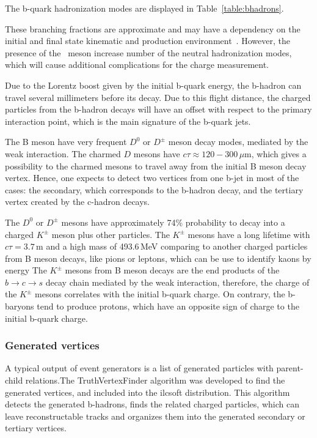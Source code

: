 The b-quark hadronization modes are displayed in Table~\ref{table:bhadrons}.


These branching fractions are approximate and may have a dependency on the initial and final state kinematic and production environment~\cite{bib:PDG}.
However, the presence of the \Bzs\ meson increase number of the neutral hadronization modes, which will cause additional complications for the charge measurement. 

Due to the Lorentz boost given by the initial b-quark energy, the b-hadron can travel several millimeters before its decay. Due to this flight distance, the charged particles from the b-hadron decays will have an offset with respect to the primary interaction point, which is the main signature of the b-quark jets. 

The B meson have very frequent $D^0$ or $D^\pm$ meson decay modes, mediated by the weak interaction. The charmed $D$ mesons have $c\tau \approx 120 - 300$\,$\mu$m, which gives a possibility to the charmed mesons to travel away from the initial B meson decay vertex. 
Hence, one expects to detect two vertices from one b-jet in most of the cases: the secondary, which corresponds to the b-hadron decay, and the tertiary vertex created by the c-hadron decays. 

The $D^0$ or $D^\pm$ mesons have approximately 74\% probability to decay into a charged $K^\pm$ meson plus other particles. The $K^\pm$ mesons have a long lifetime with $c\tau = 3.7$\,m and a high mass of 493.6\,MeV comparing to another charged particles from B meson decays, like pions or leptons, which can be use to identify kaons by energy The $K^\pm$ mesons from B meson decays are the end products of the $b\to c\to s$ decay chain mediated by the weak interaction, therefore, the charge of the $K^\pm$ mesons correlates with the initial b-quark charge. 
On contrary, the b-baryons tend to produce protons, which have an opposite sign of charge to the initial b-quark charge. 

\subsubsection{Generated vertices}
A typical output of event generators is a list of generated particles with parent-child relations.The TruthVertexFinder algorithm was developed to find the generated vertices, and included into the {\sc ilcsoft} distribution. This algorithm detects the generated b-hadrons, finds the related charged particles, which can leave reconstructable tracks and organizes them into the generated secondary or tertiary vertices.


